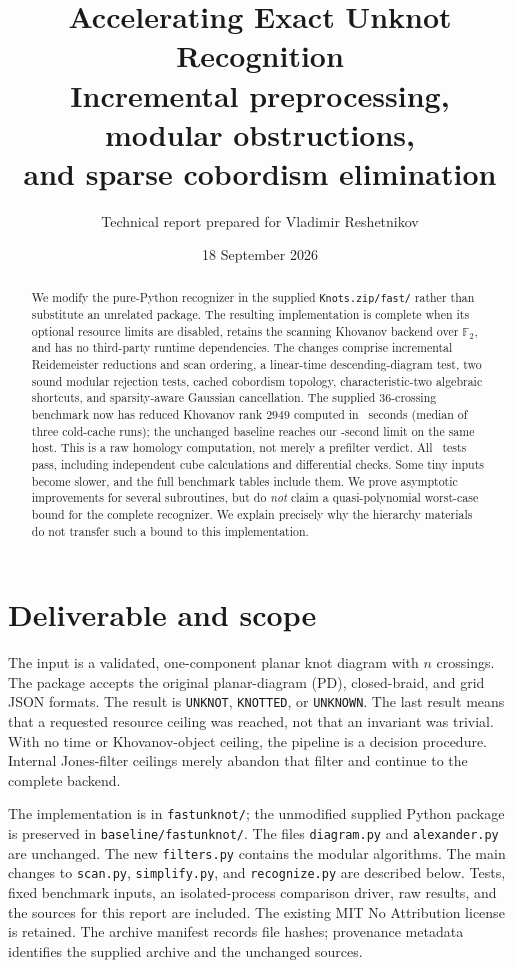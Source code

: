 \documentclass[11pt]{article}
\title{Accelerating Exact Unknot Recognition\\[5pt]
\large Incremental preprocessing, modular obstructions,\\and sparse cobordism elimination}
\author{Technical report prepared for Vladimir Reshetnikov}
\date{18 September 2026}
\theoremstyle{remark}\newtheorem{remark}[theorem]{Remark}
\newcommand{\F}{\mathbb F}
\newcommand{\code}[1]{\texttt{\small #1}}
\begin{document}
\maketitle
\begin{abstract}
We modify the pure-Python recognizer in the supplied \code{Knots.zip/fast/}
rather than substitute an unrelated package. The resulting implementation is
complete when its optional resource limits are disabled, retains the scanning
Khovanov backend over $\F_2$, and has no third-party runtime dependencies.
The changes comprise incremental Reidemeister reductions and scan ordering,
a linear-time descending-diagram test, two sound modular rejection tests,
cached cobordism topology, characteristic-two algebraic shortcuts, and
sparsity-aware Gaussian cancellation. The supplied 36-crossing benchmark now
has reduced Khovanov rank $2949$ computed in \HardTime\ seconds (median of
three cold-cache runs); the unchanged baseline reaches our \TimeLimit-second
limit on the same host. This is a raw homology computation, not merely a
prefilter verdict. All \TestCount\ tests pass, including independent cube
calculations and differential checks. Some tiny inputs become slower, and the
full benchmark tables include them. We prove asymptotic improvements for
several subroutines, but do \emph{not} claim a quasi-polynomial worst-case
bound for the complete recognizer. We explain precisely why the hierarchy
materials do not transfer such a bound to this implementation.
\end{abstract}
\vspace{0.5em}

\section{Deliverable and scope}

The input is a validated, one-component planar knot diagram with $n$ crossings.
The package accepts the original planar-diagram (PD), closed-braid, and grid
JSON formats. The result is \code{UNKNOT}, \code{KNOTTED}, or \code{UNKNOWN}.
The last result means that a requested resource ceiling was reached, not that
an invariant was trivial. With no time or Khovanov-object ceiling, the pipeline
is a decision procedure. Internal Jones-filter ceilings merely abandon that
filter and continue to the complete backend.

The implementation is in \code{fastunknot/}; the unmodified supplied Python
package is preserved in \code{baseline/fastunknot/}. The files
\code{diagram.py} and \code{alexander.py} are unchanged. The new
\code{filters.py} contains the modular algorithms. The main changes to
\code{scan.py}, \code{simplify.py}, and \code{recognize.py} are described below.
Tests, fixed benchmark inputs, an isolated-process comparison driver, raw
results, and the sources for this report are included. The existing MIT
No Attribution license is retained. The archive manifest records file hashes;
provenance metadata identifies the supplied archive and the unchanged sources.
\end{document}
